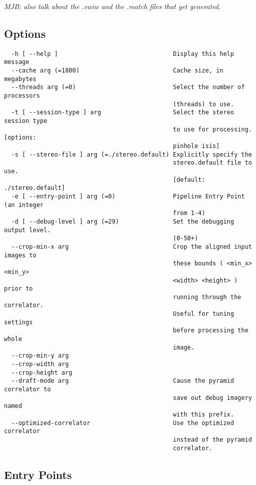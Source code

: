 \emph{MJB: also talk about the .vwiw and the .match files that get generated.}


\subsection{Options}

\begin{verbatim}
  -h [ --help ]                                Display this help message
  --cache arg (=1800)                          Cache size, in megabytes
  --threads arg (=0)                           Select the number of processors 
                                               (threads) to use.
  -t [ --session-type ] arg                    Select the stereo session type 
                                               to use for processing. [options:
                                               pinhole isis]
  -s [ --stereo-file ] arg (=./stereo.default) Explicitly specify the 
                                               stereo.default file to use. 
                                               [default: ./stereo.default]
  -e [ --entry-point ] arg (=0)                Pipeline Entry Point (an integer
                                               from 1-4)
  -d [ --debug-level ] arg (=29)               Set the debugging output level. 
                                               (0-50+)
  --crop-min-x arg                             Crop the aligned input images to
                                               these bounds ( <min_x> <min_y> 
                                               <width> <height> ) prior to 
                                               running through the correlator. 
                                               Useful for tuning settings 
                                               before processing the whole 
                                               image.
  --crop-min-y arg
  --crop-width arg
  --crop-height arg
  --draft-mode arg                             Cause the pyramid correlator to 
                                               save out debug imagery named 
                                               with this prefix.
  --optimized-correlator                       Use the optimized correlator 
                                               instead of the pyramid 
                                               correlator.
\end{verbatim}

\subsection{Entry Points}
\label{entrypoints}

